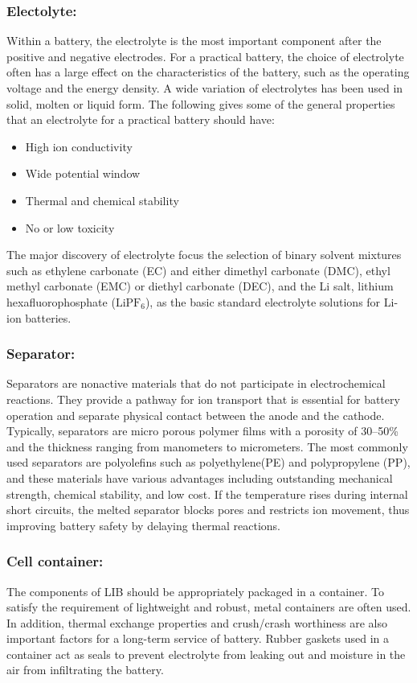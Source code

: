 \subsubsection{Electolyte:}
Within a battery, the electrolyte is the most important component after the positive and negative electrodes. For a practical battery, the choice of electrolyte often has a large effect on the characteristics of the battery, such as the operating voltage and the energy density. A wide variation of electrolytes has been used in solid, molten or liquid form.
The following gives some of the general properties that an electrolyte for a practical battery should have:
\begin{itemize}
\item High ion conductivity
\item Wide potential window
\item Thermal and chemical stability
\item No or low toxicity
\end{itemize}
The major discovery of electrolyte focus the selection of binary solvent mixtures such as ethylene carbonate (EC) and either dimethyl carbonate (DMC), ethyl methyl carbonate (EMC) or diethyl carbonate (DEC), and the Li salt, lithium hexafluorophosphate ($\mathrm{LiPF_{6}}$), as the basic standard electrolyte solutions for Li-ion batteries.
\subsubsection{Separator:}
Separators are nonactive materials that do not participate in electrochemical reactions. They provide a pathway for ion transport that is essential for battery operation and separate physical contact between the anode and the cathode. Typically, separators are micro porous polymer ﬁlms with a porosity of 30–50\% and the thickness ranging from manometers to micrometers. The most commonly used separators are polyoleﬁns such as polyethylene(PE) and polypropylene (PP), and these materials have various advantages including outstanding mechanical strength, chemical stability, and low cost. If the temperature rises during internal short circuits, the melted separator blocks pores and restricts ion movement, thus improving battery safety by delaying thermal reactions.
\subsubsection{Cell container:}
The components of LIB should  be appropriately packaged in a container. To satisfy the requirement of lightweight and robust, metal containers are often used. In addition, thermal exchange properties and crush/crash worthiness are also important factors for a long-term service of battery. Rubber gaskets used in a container act as seals to prevent electrolyte from leaking out and moisture in the air from infiltrating the battery.
